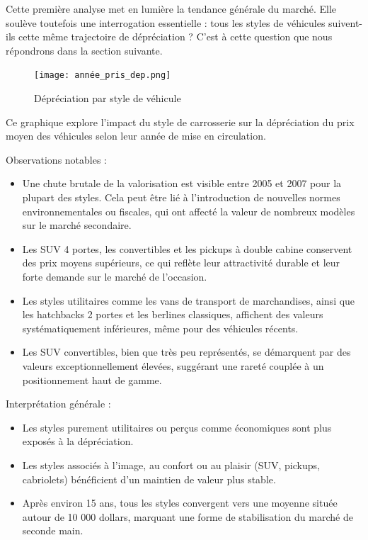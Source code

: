 \documentclass[12pt]{report}
\begin{document}
\vspace{1em}
Cette première analyse met en lumière la tendance générale du marché. Elle soulève toutefois une interrogation essentielle : tous les styles de véhicules suivent-ils cette même trajectoire de dépréciation ? C’est à cette question que nous répondrons dans la section suivante.


\begin{figure}[H]
    \centering
    \texttt{[image: année\_pris\_dep.png]}
    \caption{Dépréciation par style de véhicule}
    \label{fig:annee-pris-dep}  
\end{figure}

Ce graphique explore l’impact du style de carrosserie sur la dépréciation du prix moyen des véhicules selon leur année de mise en circulation.

\vspace{0.5em}
Observations notables :
\begin{itemize}
    \item Une chute brutale de la valorisation est visible entre 2005 et 2007 pour la plupart des styles. Cela peut être lié à l’introduction de nouvelles normes environnementales ou fiscales, qui ont affecté la valeur de nombreux modèles sur le marché secondaire.
    \item Les SUV 4 portes, les convertibles et les pickups à double cabine conservent des prix moyens supérieurs, ce qui reflète leur attractivité durable et leur forte demande sur le marché de l’occasion.
    \item Les styles utilitaires comme les vans de transport de marchandises, ainsi que les hatchbacks 2 portes et les berlines classiques, affichent des valeurs systématiquement inférieures, même pour des véhicules récents.
    \item Les SUV convertibles, bien que très peu représentés, se démarquent par des valeurs exceptionnellement élevées, suggérant une rareté couplée à un positionnement haut de gamme.
\end{itemize}

\vspace{0.5em}
Interprétation générale :
\begin{itemize}
    \item Les styles purement utilitaires ou perçus comme économiques sont plus exposés à la dépréciation.
    \item Les styles associés à l’image, au confort ou au plaisir (SUV, pickups, cabriolets) bénéficient d’un maintien de valeur plus stable.
    \item Après environ 15 ans, tous les styles convergent vers une moyenne située autour de 10 000 dollars, marquant une forme de stabilisation du marché de seconde main.
\end{itemize}
\end{document}
